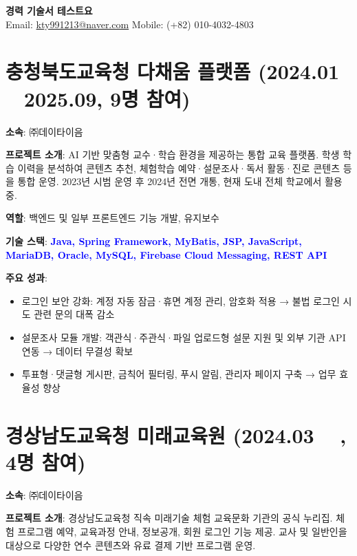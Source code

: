 \documentclass[a4paper,11pt]{article}
\newcommand{\tech}[1]{\textbf{\textcolor{blue}{#1}}}
\begin{document}
\begin{center}
    {\LARGE \textbf{경력 기술서 테스트요}} \\[6pt]
    Email: \href{mailto:kty991213@naver.com}{kty991213@naver.com} \quad
    Mobile: (+82) 010-4032-4803
\end{center}



\section{충청북도교육청 다채움 플랫폼 (2024.01 ~ 2025.09, 9명 참여)}

\textbf{소속}: ㈜데이타이음

\textbf{프로젝트 소개}:  
AI 기반 맞춤형 교수·학습 환경을 제공하는 통합 교육 플랫폼.  
학생 학습 이력을 분석하여 콘텐츠 추천, 체험학습 예약·설문조사·독서 활동·진로 콘텐츠 등을 통합 운영.  
2023년 시범 운영 후 2024년 전면 개통, 현재 도내 전체 학교에서 활용 중.

\textbf{역할}: 백엔드 및 일부 프론트엔드 기능 개발, 유지보수

\textbf{기술 스택}: \tech{Java, Spring Framework, MyBatis, JSP, JavaScript, MariaDB, Oracle, MySQL, Firebase Cloud Messaging, REST API}

\textbf{주요 성과}:
\begin{itemize}[leftmargin=*]
  \item 로그인 보안 강화: 계정 자동 잠금·휴면 계정 관리, 암호화 적용 → 불법 로그인 시도 관련 문의 대폭 감소
  \item 설문조사 모듈 개발: 객관식·주관식·파일 업로드형 설문 지원 및 외부 기관 API 연동 → 데이터 무결성 확보
  \item 투표형·댓글형 게시판, 금칙어 필터링, 푸시 알림, 관리자 페이지 구축 → 업무 효율성 향상
\end{itemize}

\section{경상남도교육청 미래교육원 (2024.03 ~ , 4명 참여)}

\textbf{소속}: ㈜데이타이음

\textbf{프로젝트 소개}:  
경상남도교육청 직속 미래기술 체험 교육문화 기관의 공식 누리집.  
체험 프로그램 예약, 교육과정 안내, 정보공개, 회원 로그인 기능 제공.  
교사 및 일반인을 대상으로 다양한 연수 콘텐츠와 유료 결제 기반 프로그램 운영.
\end{document}
